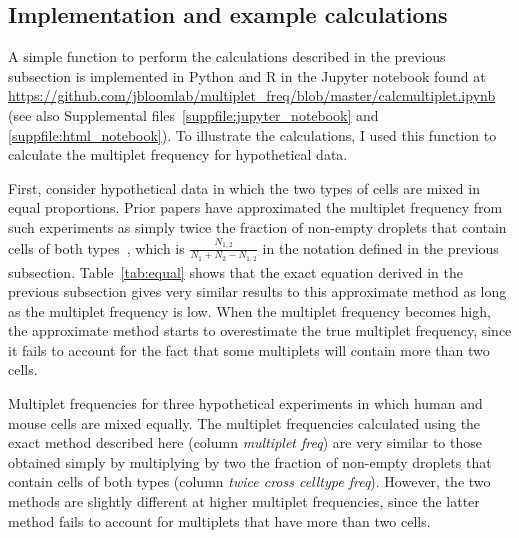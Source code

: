 \documentclass[fleqn,10pt]{wlpeerj} %
\begin{document}
\subsection*{Implementation and example calculations}
A simple function to perform the calculations described in the previous subsection is implemented in Python and R in the Jupyter notebook found at
\url{https://github.com/jbloomlab/multiplet_freq/blob/master/calcmultiplet.ipynb} (see also Supplemental files~\ref{suppfile:jupyter_notebook} and \ref{suppfile:html_notebook}).
To illustrate the calculations, I used this function to calculate the multiplet frequency for hypothetical data.

First, consider hypothetical data in which the two types of cells are mixed in equal proportions.
Prior papers have approximated the multiplet frequency from such experiments as simply twice the fraction of non-empty droplets that contain cells of both types~\citep{klein2015droplet,macosko2015highly,zheng2017massively,cao2017comprehensive}, which is $\frac{N_{1,2}}{N_1 + N_2 - N_{1,2}}$ in the notation defined in the previous subsection. 
Table~\ref{tab:equal} shows that the exact equation derived in the previous subsection gives very similar results to this approximate method as long as the multiplet frequency is low.
When the multiplet frequency becomes high, the approximate method starts to overestimate the true multiplet frequency, since it fails to account for the fact that some multiplets will contain more than two cells.

\begin{table}[b]
\centering

\caption{\label{tab:equal}
Multiplet frequencies for three hypothetical experiments in which human and mouse cells are mixed equally.
The multiplet frequencies calculated using the exact method described here (column \emph{multiplet freq}) are very similar to those obtained simply by multiplying by two the fraction of non-empty droplets that contain cells of both types (column \emph{twice cross celltype freq}).
However, the two methods are slightly different at higher multiplet frequencies, since the latter method fails to account for multiplets that have more than two cells.}
\end{table}
\end{document}

